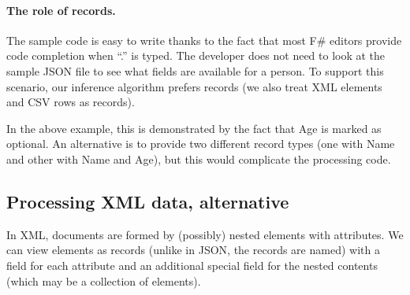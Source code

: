 \documentclass[10pt,preprint,clearpagebib]{sigplanconf}
\newcommand{\ident}[1]{\textnormal{\sffamily #1}}
\begin{document}
\paragraph{The role of records.}
The sample code is easy to write thanks to the fact that most F\# editors provide code completion
when ``.'' is typed. The developer does not need to look at the sample JSON file to see what fields
are available for a person. To support this scenario, our inference algorithm prefers records
(we also treat XML elements and CSV rows as records).

In the above example, this is demonstrated by the fact that \ident{Age} is marked as optional.
An alternative is to provide two different record types (one with \ident{Name} and other with 
\ident{Name} and \ident{Age}), but this would complicate the processing code.


\subsection{Processing XML data, alternative}
\label{sec:providers-xml}

In XML, documents are formed by (possibly) nested elements with attributes. We can view elements
as records (unlike in JSON, the records are named) with a field for each attribute and an additional
special field for the nested contents (which may be a collection of elements).
\end{document}
